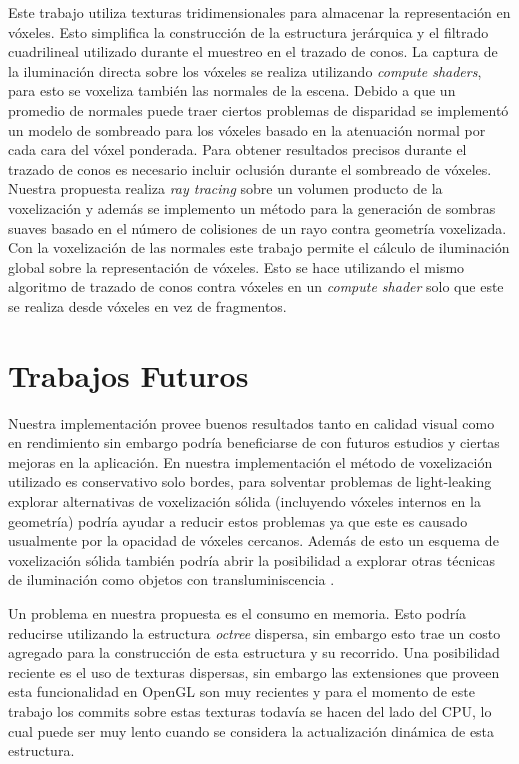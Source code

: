 Este trabajo utiliza texturas tridimensionales para almacenar la representación en vóxeles. Esto simplifica la construcción de la estructura jerárquica y el filtrado cuadrilineal utilizado durante el muestreo en el trazado de conos. La captura de la iluminación directa sobre los vóxeles se realiza utilizando \emph{compute shaders}, para esto se voxeliza también las normales de la escena. Debido a que un promedio de normales puede traer ciertos problemas de disparidad se implementó un modelo de sombreado para los vóxeles basado en la atenuación normal por cada cara del vóxel ponderada. Para obtener resultados precisos durante el trazado de conos es necesario incluir oclusión durante el sombreado de vóxeles. Nuestra propuesta realiza \emph{ray tracing} sobre un volumen producto de la voxelización y además se implemento un método para la generación de sombras suaves basado en el número de colisiones de un rayo contra geometría voxelizada. Con la voxelización de las normales este trabajo permite el cálculo de iluminación global sobre la representación de vóxeles. Esto se hace utilizando el mismo algoritmo de trazado de conos contra vóxeles en un \emph{compute shader} solo que este se realiza desde vóxeles en vez de fragmentos.

\section{Trabajos Futuros} %
\label{sec:trabajos_futuros}
Nuestra implementación provee buenos resultados tanto en calidad visual como en rendimiento sin embargo podría beneficiarse de con futuros estudios y ciertas mejoras en la aplicación. En nuestra implementación el método de voxelización utilizado es conservativo solo bordes, para solventar problemas de light-leaking explorar alternativas de voxelización sólida (incluyendo vóxeles internos en la geometría) podría ayudar a reducir estos problemas ya que este es causado usualmente por la opacidad de vóxeles cercanos. Además de esto un esquema de voxelización sólida también podría abrir la posibilidad a explorar otras técnicas de iluminación como objetos con transluminiscencia \cite{Eisemann:2008:SGS:1375714.1375728}.

Un problema en nuestra propuesta es el consumo en memoria. Esto podría reducirse utilizando la estructura \emph{octree} dispersa, sin embargo esto trae un costo agregado para la construcción de esta estructura y su recorrido. Una posibilidad reciente es el uso de texturas dispersas, sin embargo las extensiones que proveen esta funcionalidad en OpenGL son muy recientes y para el momento de este trabajo los commits sobre estas texturas todavía se hacen del lado del CPU, lo cual puede ser muy lento cuando se considera la actualización dinámica de esta estructura.

